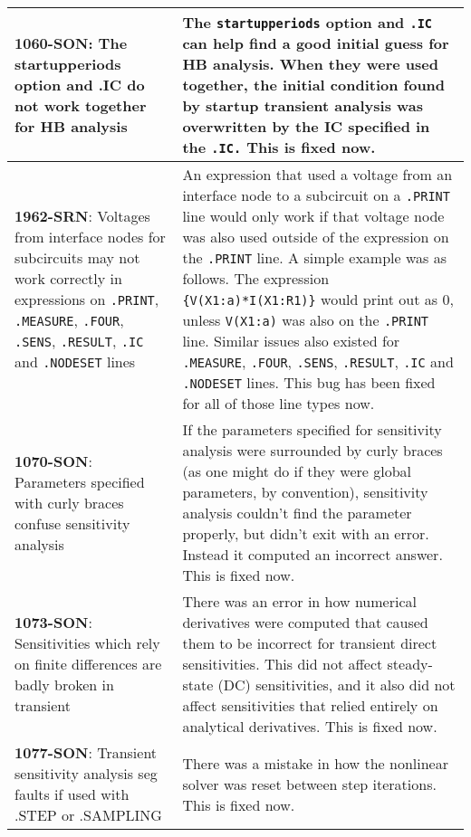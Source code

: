 {\begin{longtable}[h] {>{\raggedright\small}m{2in}|>{\raggedright\let\\\tabularnewline\small}m{3.5in}}
     \textbf{1060-SON}: The startupperiods option and .IC do not work together for 
     HB analysis  & The \texttt{startupperiods} option and \texttt{.IC} can help find a good initial
     guess for HB analysis. When they were used together, the initial condition found  
     by startup transient analysis was overwritten by the IC specified in the \texttt{.IC.}
     This is fixed now. \\ \hline

     \textbf{1962-SRN}: Voltages from interface nodes for subcircuits may not 
     work correctly in expressions on \texttt{.PRINT}, \texttt{.MEASURE}, 
     \texttt{.FOUR}, \texttt{.SENS}, \texttt{.RESULT}, \texttt{.IC} and 
     \texttt{.NODESET} lines & An expression that used a voltage from an 
     interface node to a subcircuit on a \texttt{.PRINT} line would only work 
     if that voltage node was also used outside of the expression on the 
     \texttt{.PRINT} line.  A simple example was as follows.  The expression 
     \texttt{\{V(X1:a)*I(X1:R1)\}} would print out as 0, unless 
     \texttt{V(X1:a)} was also on the \texttt{.PRINT} line.  Similar issues
     also existed for \texttt{.MEASURE}, \texttt{.FOUR}, \texttt{.SENS}, 
     \texttt{.RESULT}, \texttt{.IC} and \texttt{.NODESET} lines.  This bug
     has been fixed for all of those line types now.
     \\ \hline

     \textbf{1070-SON}: Parameters specified with curly braces confuse \Xyce{} sensitivity analysis  &
     If the parameters specified for sensitivity analysis were surrounded by curly braces (as one
     might do if they were global parameters, by convention), sensitivity analysis couldn't find
     the parameter properly, but didn't exit with an error.  Instead it computed an incorrect answer.
     This is fixed now. \\ \hline

     \textbf{1073-SON}: Sensitivities which rely on finite differences are badly broken in transient &
     There was an error in how numerical derivatives were computed that caused them to be incorrect 
     for transient direct sensitivities.  This did not affect steady-state (DC) sensitivities, and it 
     also did not affect sensitivities that relied entirely on analytical derivatives.
     This is fixed now. \\ \hline

     \textbf{1077-SON}: Transient sensitivity analysis seg faults if used with .STEP or .SAMPLING &
     There was a mistake in how the nonlinear solver was reset between step iterations.
     This is fixed now. \\ \hline

\end{longtable}
}
